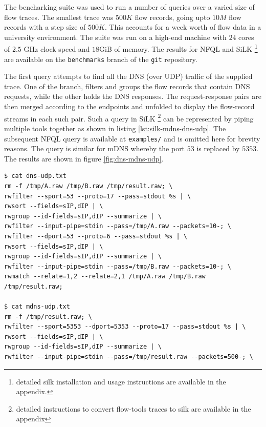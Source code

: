 The bencharking suite was used to run a number of queries over a varied size
of flow traces. The smallest trace was $500K$ flow records, going upto $10M$
flow records with a step size of $500K$. This accounts for a week worth of
flow data in a university environment. The suite was run on a high-end machine
with $24$ cores of $2.5$ GHz clock speed and $18$GiB of memory. The results
for NFQL and SiLK \footnote{detailed silk installation and usage instructions
are available in the appendix.} are available on the \texttt{benchmarks}
branch of the \texttt{git} repository.

The first query attempts to find all the DNS (over UDP) traffic of the
supplied trace. One of the branch, filters and groups the flow records that
contain DNS requests, while the other holds the DNS responses. The
request-response pairs are then merged according to the endpoints and unfolded
to  display the flow-record
streams in each such pair. Such a query in SiLK \footnote{detailed
instructions to convert flow-tools traces to silk are available in the
appendix} can be represented by piping multiple tools together as shown in
listing \ref{lst:silk-mdns-dns-udp}. The subsequent NFQL query is available at
\texttt{examples/} and is omitted here for brevity reasons. The query is
similar for mDNS whereby the port $53$ is replaced by $5353$. The results are
shown in figure \ref{fig:dns-mdns-udp}.

\begin{lstlisting}
$ cat dns-udp.txt 
rm -f /tmp/A.raw /tmp/B.raw /tmp/result.raw; \
rwfilter --sport=53 --proto=17 --pass=stdout %s | \
rwsort --fields=sIP,dIP | \
rwgroup --id-fields=sIP,dIP --summarize | \
rwfilter --input-pipe=stdin --pass=/tmp/A.raw --packets=10-; \
rwfilter --dport=53 --proto=6 --pass=stdout %s | \
rwsort --fields=sIP,dIP | \
rwgroup --id-fields=sIP,dIP --summarize | \
rwfilter --input-pipe=stdin --pass=/tmp/B.raw --packets=10-; \
rwmatch --relate=1,2 --relate=2,1 /tmp/A.raw /tmp/B.raw /tmp/result.raw;

$ cat mdns-udp.txt
rm -f /tmp/result.raw; \
rwfilter --sport=5353 --dport=5353 --proto=17 --pass=stdout %s | \
rwsort --fields=sIP,dIP | \
rwgroup --id-fields=sIP,dIP --summarize | \
rwfilter --input-pipe=stdin --pass=/tmp/result.raw --packets=500-; \
\end{lstlisting}

